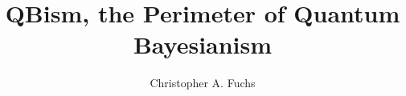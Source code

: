 
\newcommand{\bq}{\begin{quotation}}
\newcommand{\eq}{\end{quotation}}

\newcommand{\veec}[4]{%
\begin{array}{c}{\!\!#1\!\!}\\{\!\!#2\!\!}\\{\!\!#3\!\!}\\{\!\!#4\!\!}\end{array}}



\title{QBism, the Perimeter of Quantum Bayesianism}
\author{Christopher A. Fuchs}

\address{Perimeter Institute for Theoretical Physics\\
Waterloo, Ontario N2L 2Y5, Canada\medskip\\
{\tt cfuchs@perimeterinstitute.ca}}


\maketitle

